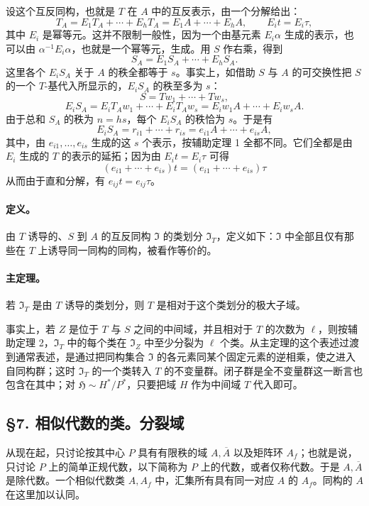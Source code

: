 设这个互反同构，也就是 \(T\) 在 \(A\) 中的互反表示，由一个分解给出：
\[
        T_A=E_1T_A+\cdots+E_hT_A
            =E_1A+\cdots+E_hA,
        \qquad E_it=E_i\tau ,
\]
其中 \(E_i\) 是幂等元。这并不限制一般性，因为一个由基元素 \(E_i\alpha\) 生成的表示，也可以由 \(\alpha^{-1}E_i\alpha\)，也就是一个幂等元，生成。用 \(S\) 作右乘，得到
\[
        S_A=E_1S_A+\cdots+E_hS_A .
\]
这里各个 \(E_iS_A\) 关于 \(A\) 的秩全都等于 \(s\)。事实上，如借助 \(S\) 与 \(A\) 的可交换性把 \(S\) 的一个 \(T\)-基代入所显示的，\(E_iS_A\) 的秩至多为 \(s\)：
\[
        S=Tw_1+\cdots+Tw_s,
\]
\[
        E_iS_A=E_iT_Aw_1+\cdots+E_iT_Aw_s
              =E_iw_1A+\cdots+E_iw_sA .
\]
由于总和 \(S_A\) 的秩为 \(n=hs\)，每个 \(E_iS_A\) 的秩恰为 \(s\)。于是有
\[
        E_iS_A=r_{i1}+\cdots+r_{is}
              =e_{i1}A+\cdots+e_{is}A,
\]
其中，由 \(e_{i1},\ldots,e_{is}\) 生成的这 \(s\) 个表示，按辅助定理 1 全都不同。它们全都是由 \(E_i\) 生成的 \(T\) 的表示的延拓；因为由 \(E_it=E_i\tau\) 可得
\[
        (e_{i1}+\cdots+e_{is})t=(e_{i1}+\cdots+e_{is})\tau
\]
从而由于直和分解，有 \(e_{ij}t=e_{ij}\tau\)。

\paragraph{定义。}
由 \(T\) 诱导的、\(S\) 到 \(A\) 的互反同构 \(\mathfrak I\) 的类划分 \(\mathfrak I_T\)，定义如下：\(\mathfrak I\) 中全部且仅有那些在 \(T\) 上诱导同一同构的同构，被看作等价的。

\paragraph{主定理。}
若 \(\mathfrak I_T\) 是由 \(T\) 诱导的类划分，则 \(T\) 是相对于这个类划分的极大子域。

事实上，若 \(Z\) 是位于 \(T\) 与 \(S\) 之间的中间域，并且相对于 \(T\) 的次数为 \(\ell\)，则按辅助定理 2，\(\mathfrak I_T\) 中的每个类在 \(\mathfrak I_Z\) 中至少分裂为 \(\ell\) 个类。从主定理的这个表述过渡到通常表述，是通过把同构集合 \(\mathfrak I\) 的各元素同某个固定元素的逆相乘，使之进入自同构群；这时 \(\mathfrak I_T\) 的一个类转入 \(T\) 的不变量群。闭子群是全不变量群这一断言也包含在其中；对 \(\mathfrak H\sim H^*/P^*\)，只要把域 \(H\) 作为中间域 \(T\) 代入即可。

\subsection*{§7. 相似代数的类。分裂域}

从现在起，只讨论按其中心 \(P\) 具有有限秩的域 \(A,\overline A\) 以及矩阵环 \(A_f\)；也就是说，只讨论 \(P\) 上的简单正规代数，以下简称为 \(P\) 上的代数，或者仅称代数。于是 \(A,\overline A\) 是除代数。一个相似代数类 \(A,A_f\) 中，汇集所有具有同一对应 \(A\) 的 \(A_f\)。同构的 \(A\) 在这里加以认同。

